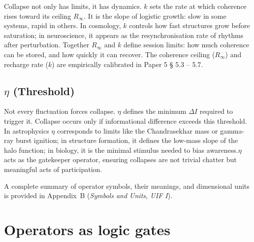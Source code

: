 Collapse not only has limits, it has dynamics. $k$ sets the rate at which coherence rises toward
its ceiling  $R_\infty$. It is the slope of logistic growth: slow in some systems, rapid in others. In cosmology, $k$ controls how fast structures grow before saturation; in neuroscience, it
appears as the resynchronisation rate of rhythms after perturbation. Together  $R_\infty$ and $k$ define session limits: how much coherence can be stored, and how quickly it can recover. The coherence ceiling ($R_\infty$) and recharge rate ($k$) are empirically calibrated in Paper 5 §
5.3 – 5.7.

\subsection{$\eta$ (Threshold)}

Not every fluctuation forces collapse. $\eta$ defines the minimum $\Delta I$ required to trigger it. Collapse occurs only if informational difference exceeds this threshold. In astrophysics $\eta$ corresponds to limits like the Chandrasekhar mass or gamma-ray burst ignition; in
structure formation, it defines the low-mass slope of the halo function; in biology, it is the
minimal stimulus needed to bias awareness.$\eta$ acts as the gatekeeper operator, ensuring
collapses are not trivial chatter but meaningful acts of participation.
\noindent

A complete summary of operator symbols, their meanings, and dimensional units
is provided in Appendix~B (\textit{Symbols and Units, UIF I}).
\section{Operators as logic gates}

